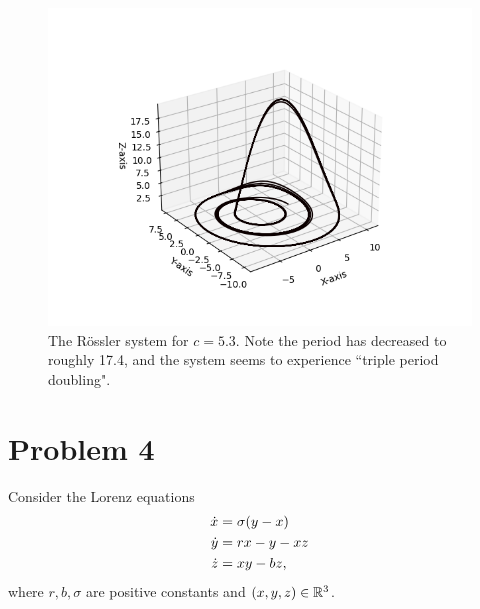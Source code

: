 \begin{figure}
    \centering
    \includegraphics{Images/p3 bullshit.png}
    \caption{The R\"ossler system for $c = 5.3$. Note the period has decreased to roughly 17.4, and the system seems to experience ``triple period doubling".}
    \label{fig:p3 newplot}
\end{figure}
\newpage
\section{Problem 4}
Consider the Lorenz equations
\begin{align}
    \dot{x} &= \sigma(y - x) \nonumber\\
    \dot{y} &= rx - y - xz \nonumber\\
    \dot{z} &= xy - bz, \nonumber    
\end{align}
where $r, b, \sigma$ are positive constants and $(x, y, z)\in \mathbb{R}^3$.

